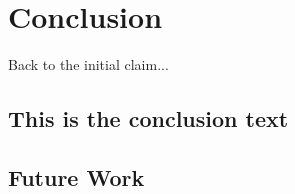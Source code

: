 \label{Conclusion}
\section{Conclusion}

Back to the initial claim...
\subsection{This is the conclusion text}

\subsection{Future Work}